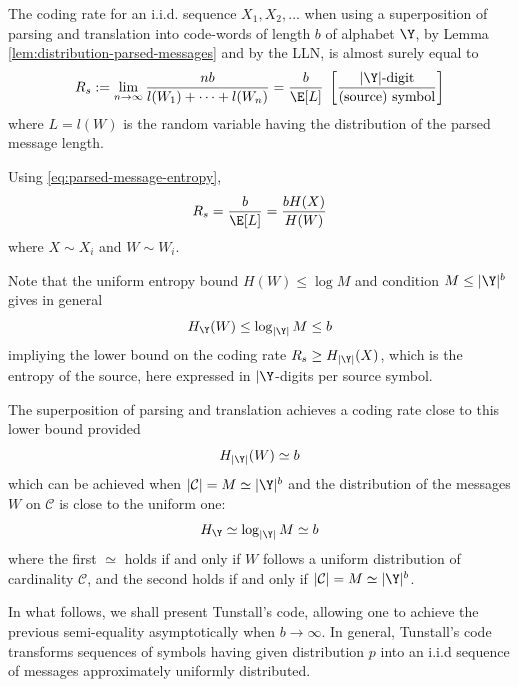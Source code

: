 \documentclass[toc, titlepaged]{../cs-classes/cs-classes}
\begin{document}
\begin{property}
    The coding rate for an i.i.d. sequence $X_1, X_2, \dots$ when using a superposition of parsing and translation into code-words of length $b$ of alphabet $\Y$, by Lemma \ref{lem:distribution-parsed-messages} and by the LLN, is almost surely equal to
    \begin{equation}
        \label{eq:parsing-conding-rate-def}
        R_s := \lim_{n\to\infty} \frac{nb}{l(W_1)+\dots+l(W_n)} = \frac{b}{\E[L]} \; \left[\frac{|\Y|\textnormal{-digit}}{\textnormal{(source) symbol}}\right]
    \end{equation}
    where $L=l(W)$ is the random variable having the distribution of the parsed message length.

    Using \eqref{eq:parsed-message-entropy},
    \begin{equation*}
        R_s = \frac{b}{\E[L]} = \frac{bH(X)}{H(W)}
    \end{equation*}
    where $X\sim X_i$ and $W\sim W_i$.
\end{property}

\begin{remark}
    Note that the uniform entropy bound $H(W)\leq\log M$ and condition $M\leq|\Y|^b$ gives in general
    \begin{equation*}
        H_{\Y}(W)\leq\log_{|\Y|} M\leq b
    \end{equation*}
    impliying the lower bound on the coding rate $R_s\geq H_{|\Y|}(X)$, which is the entropy of the source, here expressed in $|\Y$-digits per source symbol.
\end{remark}

The superposition of parsing and translation achieves a coding rate close to this lower bound provided
\begin{equation}
    \label{eq:entropy-sim-b}
    H_{|\Y|}(W) \simeq b
\end{equation}
which can be achieved when $|\mathcal{C}| = M \simeq |\Y|^b$ and the distribution of the messages $W$ on $\mathcal{C}$ is close to the uniform one:
\begin{equation*}
    H_{\Y} \simeq \log_{|\Y|}M \simeq b
\end{equation*}
where the first $\simeq$ holds if and only if $W$ follows a uniform distribution of cardinality $\mathcal{C}$, and the second holds if and only if $|\mathcal{C}|=M\simeq|\Y|^b$.

In what follows, we shall present Tunstall's code, allowing one to achieve the previous semi-equality asymptotically when $b\to\infty$. In general, Tunstall's code transforms sequences of symbols having given distribution $p$ into an i.i.d sequence of messages approximately uniformly distributed.
\end{document}
